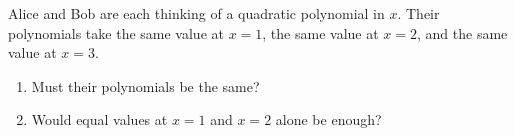 Alice and Bob are each thinking of a quadratic polynomial in $x$. Their polynomials take the same value at $x=1$, the same value at $x=2$, and the same value at $x=3$.
\begin{enumerate}
\item[(a)] Must their polynomials be the same?
\item[(b)] Would equal values at $x=1$ and $x=2$ alone be enough?
\end{enumerate}
